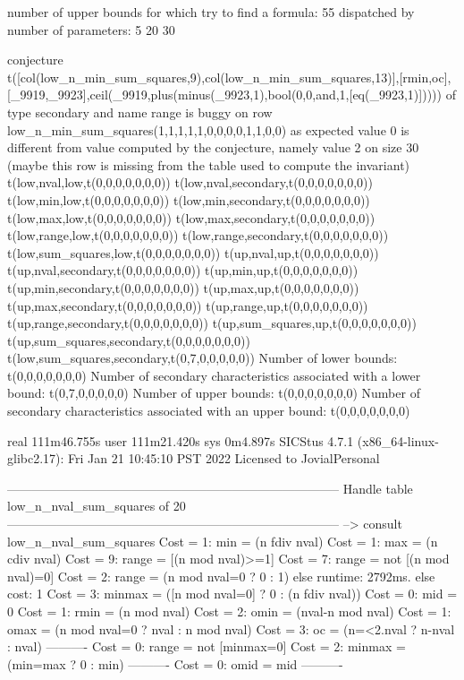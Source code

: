 number of upper bounds for which try to find a formula: 55
dispatched by number of parameters: 5  20  30

conjecture t([col(low_n_min_sum_squares,9),col(low_n_min_sum_squares,13)],[rmin,oc],[_9919,_9923],ceil(_9919,plus(minus(_9923,1),bool(0,0,and,1,[eq(_9923,1)])))) of type secondary and name range is buggy on row low_n_min_sum_squares(1,1,1,1,1,0,0,0,0,1,1,0,0) as expected value 0 is different from value computed by the conjecture, namely value 2 on size 30
(maybe this row is missing from the table used to compute the invariant)
t(low,nval,low,t(0,0,0,0,0,0,0))
t(low,nval,secondary,t(0,0,0,0,0,0,0))
t(low,min,low,t(0,0,0,0,0,0,0))
t(low,min,secondary,t(0,0,0,0,0,0,0))
t(low,max,low,t(0,0,0,0,0,0,0))
t(low,max,secondary,t(0,0,0,0,0,0,0))
t(low,range,low,t(0,0,0,0,0,0,0))
t(low,range,secondary,t(0,0,0,0,0,0,0))
t(low,sum_squares,low,t(0,0,0,0,0,0,0))
t(up,nval,up,t(0,0,0,0,0,0,0))
t(up,nval,secondary,t(0,0,0,0,0,0,0))
t(up,min,up,t(0,0,0,0,0,0,0))
t(up,min,secondary,t(0,0,0,0,0,0,0))
t(up,max,up,t(0,0,0,0,0,0,0))
t(up,max,secondary,t(0,0,0,0,0,0,0))
t(up,range,up,t(0,0,0,0,0,0,0))
t(up,range,secondary,t(0,0,0,0,0,0,0))
t(up,sum_squares,up,t(0,0,0,0,0,0,0))
t(up,sum_squares,secondary,t(0,0,0,0,0,0,0))
t(low,sum_squares,secondary,t(0,7,0,0,0,0,0))
Number of lower bounds:                                             t(0,0,0,0,0,0,0)
Number of secondary characteristics associated with a lower bound:  t(0,7,0,0,0,0,0)
Number of upper bounds:                                             t(0,0,0,0,0,0,0)
Number of secondary characteristics associated with an upper bound: t(0,0,0,0,0,0,0)

real	111m46.755s
user	111m21.420s
sys	0m4.897s
SICStus 4.7.1 (x86_64-linux-glibc2.17): Fri Jan 21 10:45:10 PST 2022
Licensed to JovialPersonal


--------------------------------------------------------------------------------
Handle table low_n_nval_sum_squares of 20
--------------------------------------------------------------------------------
--> consult low_n_nval_sum_squares
Cost =  1:  min    = (n fdiv nval)
Cost =  1:  max    = (n cdiv nval)
Cost =  9:  range  = [(n mod nval)>=1]
Cost =  7:  range  = not [(n mod nval)=0]
Cost =  2:  range  = (n mod nval=0 ? 0 : 1)
else runtime: 2792ms. else cost: 1
Cost =  3:  minmax = ([n mod nval=0] ? 0 : (n fdiv nval)) %
Cost =  0:  mid    = 0
Cost =  1:  rmin   = (n mod nval)
Cost =  2:  omin   = (nval-n mod nval)
Cost =  1:  omax   = (n mod nval=0 ? nval : n mod nval)
Cost =  3:  oc     = (n=<2.nval ? n-nval : nval)
----------
Cost =  0:  range  = not [minmax=0]
Cost =  2:  minmax = (min=max ? 0 : min)
----------
Cost =  0:  omid   = mid
----------

